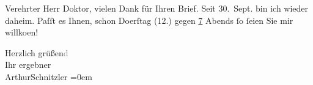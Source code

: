 \pstart{}Verehrter Herr Doktor,\pend\vspace{0.5em}
\pstart
           vielen Dank für Ihren Brief. Seit 30. Sept. bin ich wieder daheim. Paſſt
               es Ihnen, schon Do{\geminationn}erſtag (12.) gegen \uline{7} Abends{ }ſo{ }ſeien Sie mir willko{\geminationm}en!\pend
           
\pstart
           Herzlich grüßen\textcolor{gray}{d}{\\[\baselineskip]}Ihr ergebner{\\[\baselineskip]}\spacefill\mbox{ArthurSchnitzler}\pend
           \leftskip=0em{}\endnumbering{}  \newcommand{\dateiname}{L02243}\newcommand{\titel}{Arthur Schnitzler an Robert Adam, 9. 10. 1916}\newcommand{\editorInnen}{Martin Anton Müller und Gerd-Hermann Susen}
